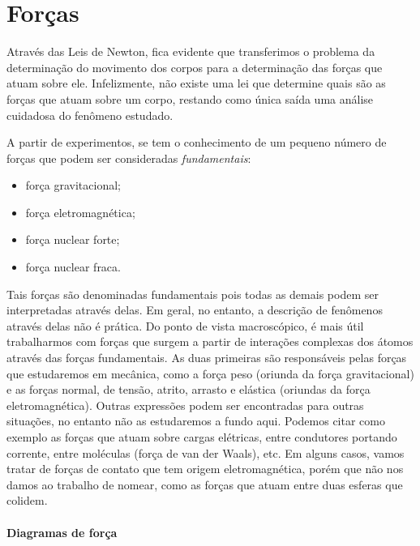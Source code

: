 \section{Forças}

Através das Leis de Newton, fica evidente que transferimos o problema da determinação do movimento dos corpos para a determinação das forças que atuam sobre ele. Infelizmente, não existe uma lei que determine quais são as forças que atuam sobre um corpo, restando como única saída uma análise cuidadosa do fenômeno estudado.

A partir de experimentos, se tem o conhecimento de um pequeno número de forças que podem ser consideradas \emph{fundamentais}:
\begin{itemize}
  \item força gravitacional;
  \item força eletromagnética;
  \item força nuclear forte;
  \item força nuclear fraca.
\end{itemize}
%
Tais forças são denominadas fundamentais pois todas as demais podem ser interpretadas através delas. Em geral, no entanto, a descrição de fenômenos através delas não é prática. Do ponto de vista macroscópico, é mais útil trabalharmos com forças que surgem a partir de interações complexas dos átomos através das forças fundamentais. As duas primeiras são responsáveis pelas forças que estudaremos em mecânica, como a força peso (oriunda da força gravitacional) e as forças normal, de tensão, atrito, arrasto e elástica (oriundas da força eletromagnética). Outras expressões podem ser encontradas para outras situações, no entanto não as estudaremos a fundo aqui. Podemos citar como exemplo as forças que atuam sobre cargas elétricas, entre condutores portando corrente, entre moléculas (força de van der Waals), etc. Em alguns casos, vamos tratar de forças de contato que tem origem eletromagnética, porém que não nos damos ao trabalho de nomear, como as forças que atuam entre duas esferas que colidem.

\paragraph{Diagramas de força} 

